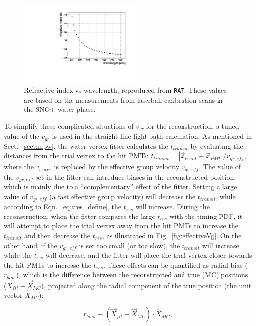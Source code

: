 \begin{figure}[!htb]
	\centering
	\includegraphics[width=6cm]{refractiveIndexVsWavelength.pdf}
	\caption[Refractive index vs wavelength.]{Refractive index vs wavelength, reproduced from \texttt{RAT}. These values are based on the measurements from laserball calibration scans in the SNO+ water phase\cite{laserball_groupVelocity}.}
	\label{nVsWavelength}
\end{figure}

To simplify these complicated situations of $v_{gr}$ for the reconstruction, a tuned value of the $v_{gr}$ is used in the straight line light path calculation. As mentioned in Sect.~\ref{sect:mpw}, the water vertex fitter calculates the $t_{transit}$ by evaluating the distances from the trial vertex to the hit PMTs: $t_{transit}=|\vec{x}_{event}-\vec{x}_{PMT}|/v_{gr,eff}$, where the $v_{water}$ is replaced by the effective group velocity $v_{gr,eff}$. The value of the $v_{gr,eff}$ set in the fitter can introduce biases in the reconstructed position, which is mainly due to a ``complementary'' effect of the fitter. Setting a large value of $v_{gr,eff}$ (a fast effective group velocity) will decrease the $t_{transit}$, while according to Eqn.~\ref{eq:tres_define}, the $t_{res}$ will increase. During the reconstruction, when the fitter compares the large $t_{res}$ with the timing PDF, it will attempt to place the trial vertex away from the hit PMTs to increase the $t_{transit}$ and then decrease the $t_{res}$, as illustrated in Fig.~\ref{fig:effectiveVg}. On the other hand, if the $v_{gr,eff}$ is set too small (or too slow), the $t_{transit}$ will increase while the $t_{res}$ will decrease, and the fitter will place the trial vertex closer towards the hit PMTs to increase the $t_{res}$. These effects can be quantified as radial bias ($r_{bias}$), which is the difference between the reconstructed and true (MC) positions ($\vec{X}_{fit}-\vec{X}_{MC}$), projected along the radial component of the true position (the unit vector $\hat{X}_{MC}$)\cite{coulter2013modelling}:

\begin{equation}
r_{bias} \equiv (\vec{X}_{fit}-\vec{X}_{MC})\cdot \hat{X}_{MC},
\end{equation}

